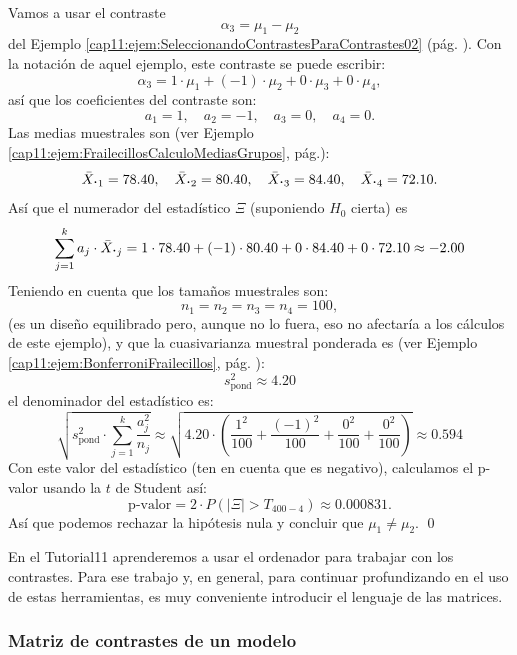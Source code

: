 \begin{ejemplo}
\label{cap11:ejem:ContrasteHipotesisSobreContraste}
Vamos a usar el contraste
\[\alpha_3=\mu_1-\mu_2\]
del Ejemplo \ref{cap11:ejem:SeleccionandoContrastesParaContrastes02} (pág. \pageref{cap11:ejem:SeleccionandoContrastesParaContrastes02}).  Con la notación de aquel ejemplo, este contraste se puede escribir:
\[\alpha_3=1\cdot \mu_1+ (-1)\cdot \mu_2+0\cdot\mu_3+0\cdot\mu_4,\]
así que los coeficientes del contraste son:
\[a_1=1,\quad a_2=-1,\quad a_3=0, \quad a_4=0.\]
Las medias muestrales son (ver Ejemplo \ref{cap11:ejem:FrailecillosCalculoMediasGrupos}, pág.\pageref{cap11:ejem:FrailecillosCalculoMediasGrupos}):
\[
\bar X_{{\mbox{\bf\large$\cdot$}}1}=78.40,\quad
\bar X_{{\mbox{\bf\large$\cdot$}}2}=80.40,\quad
\bar X_{{\mbox{\bf\large$\cdot$}}3}=84.40,\quad
\bar X_{{\mbox{\bf\large$\cdot$}}4}=72.10.
\]
Así que el numerador del estadístico $\Xi$  (suponiendo $H_0$ cierta) es
\[
\sum_{j=1}^{k}a_j\cdot\bar X_{\mbox{\bf\large $\cdot$}j}=
1\cdot78.40+(-1)\cdot 80.40+0\cdot 84.40+0\cdot 72.10\approx -2.00
\]
Teniendo en cuenta que los tamaños muestrales son:
\[n_1=n_2=n_3=n_4=100,\]
(es un diseño equilibrado pero, aunque no lo fuera, eso no afectaría a los cálculos de este ejemplo), y que la cuasivarianza muestral ponderada es (ver Ejemplo \ref{cap11:ejem:BonferroniFrailecillos}, pág. \pageref{cap11:ejem:BonferroniFrailecillos}):
\[
s_{\mbox{pond}}^2\approx 4.20
\]
el denominador del estadístico es:
\[
\sqrt{s^2_{\mbox{pond}}\cdot\sum_{j=1}^{k}\dfrac{a_j^2}{n_j}}\approx
\sqrt{4.20\cdot\left(\dfrac{1^2}{100}+\dfrac{(-1)^2}{100}+\dfrac{0^2}{100}+\dfrac{0^2}{100}\right)}\approx 0.594
\]
Con este valor del estadístico (ten en cuenta que es negativo), calculamos el p-valor usando la $t$ de Student así:
\[\mbox{p-valor}=2\cdot P(|\Xi|>T_{400-4})\approx 0.000831.\]
Así que podemos rechazar la hipótesis nula y concluir que $\mu_1\neq\mu_2$.
\qed
\end{ejemplo}

En el Tutorial11 aprenderemos a usar el ordenador para trabajar con los contrastes. Para ese trabajo y, en general, para continuar profundizando en el uso de estas herramientas, es muy conveniente introducir el lenguaje de las matrices.

\subsubsection{Matriz de contrastes de un modelo}
\label{cap11:subsubsec:MatrizContrastesModelo}

